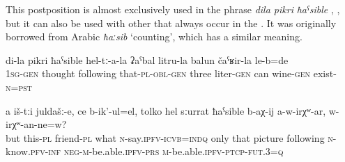 This postposition is almost exclusively used in the phrase \textit{dila pikri} \textit{ħaˁsible}  , , but it can also be used with other  that always occur in the  . It was originally borrowed from Arabic \textit{ħaːsib} `counting', which has a similar meaning.
%
\begin{exe}
	\ex
	\begin{xlist}
		\ex	\label{In my mind there was their 3-litre can with wine}
		\gll	di-la	pikri	ħaˁsible	hel-tː-a-la	ʡaˁbal	litru-la	balun	čaˁʁir-la le-b=de\\
			1\textsc{sg}-\textsc{gen}	thought	following	that-\textsc{pl}-\textsc{obl}-\textsc{gen}	three	liter-\textsc{gen} can	wine-\textsc{gen}	exist-\textsc{n}=\textsc{pst}\\
		\glt	{}

		\ex	\label{And these friends, what they are saying, only by means of the picture, (one) cannot know, can}
		\gll	a	iš-tːi	juldašː-e,	ce	b-ik'-ul=el,	tolko	hel	sːurrat	ħaˁsible	b-aχ-ij	a-w-irχʷ-ar,	w-irχʷ-an-ne=w?\\
			but	this-\textsc{pl}	friend-\textsc{pl}	what	\textsc{n}-say.\textsc{ipfv}-\textsc{icvb}=\textsc{indq}	only	that	picture	following	\textsc{n}-know.\textsc{pfv}-\textsc{inf}	\textsc{neg}-\textsc{m}-be.able.\textsc{ipfv}-\textsc{prs}	\textsc{m}-be.able.\textsc{ipfv}-\textsc{ptcp-fut.3=q}\\
		\glt	{}
	\end{xlist}
\end{exe}

